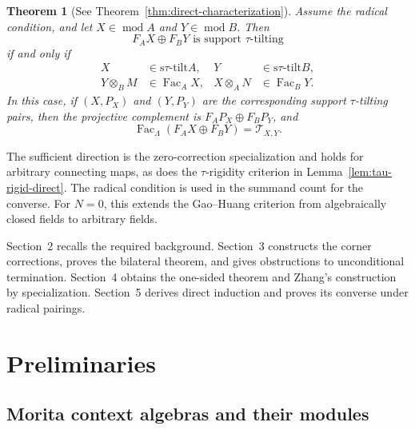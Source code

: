 \documentclass[11pt,reqno]{amsart}
\newtheorem{theorem}{Theorem}[section]
\theoremstyle{definition}
\theoremstyle{remark}
\newcommand{\modu}{\operatorname{mod}}
\newcommand{\Fac}{\operatorname{Fac}}
\newcommand{\stau}{\mathrm{s}\tau\text{-}\mathrm{tilt}}
\numberwithin{equation}{section}
\begin{document}
\begin{theorem}[See Theorem~\ref{thm:direct-characterization}]
\label{thm:intro-direct}
Assume the radical condition, and let $X\in\modu A$ and $Y\in\modu B$.
Then
\[
 F_AX\oplus F_BY\text{ is support $\tau$-tilting}
\]
if and only if
\begin{align*}
 X&\in\stau A, &Y&\in\stau B,\\
 Y\otimes_BM&\in\Fac_AX, &X\otimes_AN&\in\Fac_BY.
\end{align*}
In this case, if $(X,P_X)$ and $(Y,P_Y)$ are the corresponding support $\tau$-tilting
pairs, then the projective complement is $F_AP_X\oplus F_BP_Y$, and
\[
 \Fac_\Lambda(F_AX\oplus F_BY)=\mathcal T_{X,Y}.
\]
\end{theorem}

The sufficient direction is the zero-correction specialization and holds
for arbitrary connecting maps, as does the $\tau$-rigidity criterion in
Lemma~\ref{lem:tau-rigid-direct}.  The radical condition is used in the
summand count for the converse.  For $N=0$, this extends the Gao--Huang
criterion from algebraically closed fields to arbitrary fields.

Section~2 recalls the required background.  Section~3 constructs the corner
corrections, proves the bilateral theorem, and gives obstructions to
unconditional termination.  Section~4 obtains the one-sided theorem and
Zhang's construction by specialization.  Section~5 derives direct induction
and proves its converse under radical pairings.

\section{Preliminaries}

\subsection{Morita context algebras and their modules}
\end{document}
